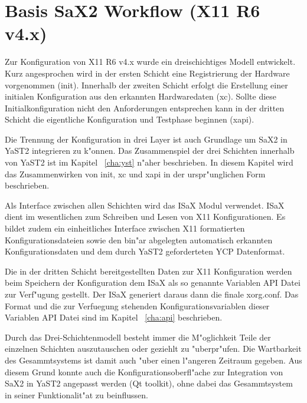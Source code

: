 \chapter{Basis SaX2 Workflow (X11 R6 v4.x)}
\label{cha:dsp}
\minitoc
Zur Konfiguration von X11 R6 v4.x wurde ein dreischichtiges Modell
entwickelt. Kurz angesprochen wird in der ersten Schicht eine
Registrierung der Hardware vorgenommen (init). Innerhalb der 
zweiten Schicht erfolgt die Erstellung einer initialen Konfiguration
aus den erkannten Hardwaredaten (xc). Sollte diese Initialkonfiguration
nicht den Anforderungen entsprechen kann in der dritten Schicht
die eigentliche Konfiguration und Testphase beginnen (xapi).

Die Trennung der Konfiguration in drei Layer ist auch Grundlage
um SaX2 in YaST2 integrieren zu k"onnen. Das Zusammenspiel
der drei Schichten innerhalb von YaST2 ist im Kapitel ~\ref{cha:yst}
n"aher beschrieben. In diesem Kapitel wird das Zusammenwirken von
init, xc und xapi in der urspr"unglichen Form beschrieben.

Als Interface zwischen allen Schichten wird das ISaX Modul
verwendet. ISaX dient im wesentlichen zum Schreiben und Lesen
von X11 Konfigurationen. Es bildet zudem ein einheitliches Interface
zwischen X11 formatierten Konfigurationsdateien sowie den bin"ar
abgelegten automatisch erkannten Konfigurationsdaten und dem
durch YaST2 geforderteten YCP Datenformat.

Die in der dritten Schicht bereitgestellten Daten zur X11 Konfiguration
werden beim Speichern der Konfiguration dem ISaX als so genannte 
Variablen API Datei zur Verf"ugung gestellt. Der ISaX generiert daraus
dann die finale xorg.conf. Das Format und die zur Verfuegung stehenden
Konfigurationsvariablen dieser Variablen API Datei sind im Kapitel 
~\ref{cha:api} beschrieben.

Durch das Drei-Schichtenmodell besteht immer die M"oglichkeit Teile 
der einzelnen Schichten auszutauschen oder geziehlt zu "uberpr"ufen.
Die Wartbarkeit des Gesammtsystems ist damit auch "uber einen l"angeren
Zeitraum gegeben. Aus diesem Grund konnte auch die 
Konfigurationsoberfl"ache zur Integration von SaX2 in YaST2 angepasst 
werden (Qt toolkit), ohne dabei das Gesammtsystem in seiner 
Funktionalit"at zu beinflussen.

